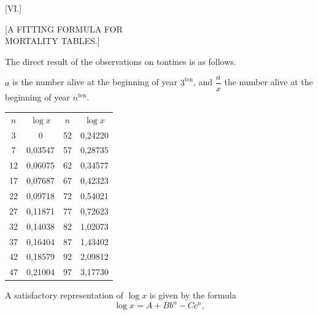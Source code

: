 \clearpage
{}
\begin{center}
[VI.]

{\large [A FITTING FORMULA FOR\\ MORTALITY TABLES.]}
\end{center}



The direct result of the observations on tontines is as follows.

$a$ is the number alive at the beginning of year $3^{\text{ten}}$, and $\dfrac{a}{x}$ the number alive at the beginning of year $n^{\text{ten}}$.

\begin{center}
\begin{tabular}{cc|cc}
$n$ & $\log x$ & $n$ & $\log x$ \\
3 & 0 & 52 & 0,24220 \\
7 & 0,03547 & 57 & 0,28735 \\
12 & 0,06075 & 62 & 0,34577 \\
17 & 0,07687 & 67 & 0,42323 \\
22 & 0,09718 & 72 & 0,54021 \\
27 & 0,11871 & 77 & 0,72623 \\
32 & 0,14038 & 82 & 1,02073 \\
37 & 0,16404 & 87 & 1,43402 \\
42 & 0,18579 & 92 & 2,09812 \\
47 & 0,21004 & 97 & 3,17730 \\
\end{tabular}
\end{center}

A satisfactory representation of $\log x$ is given by the formula
\[
\log x = A+Bb^n-Cc^n,
\]
